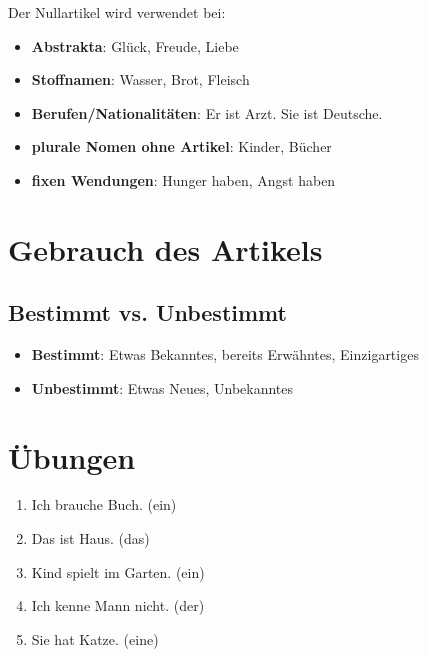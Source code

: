 Der Nullartikel wird verwendet bei:
\begin{itemize}
    \item \textbf{Abstrakta}: Glück, Freude, Liebe
    \item \textbf{Stoffnamen}: Wasser, Brot, Fleisch
    \item \textbf{Berufen/Nationalitäten}: Er ist Arzt. Sie ist Deutsche.
    \item \textbf{plurale Nomen ohne Artikel}: Kinder, Bücher
    \item \textbf{fixen Wendungen}: Hunger haben, Angst haben
\end{itemize}

\section{Gebrauch des Artikels}
\label{sec:ArtikelGebrauch}

\subsection{Bestimmt vs. Unbestimmt}
\begin{itemize}
    \item \textbf{Bestimmt}: Etwas Bekanntes, bereits Erwähntes, Einzigartiges
    \item \textbf{Unbestimmt}: Etwas Neues, Unbekanntes
\end{itemize}

\section{Übungen}
\label{sec:ArtikelUebungen}

\begin{enumerate}
    \item Ich brauche \underline{\hspace{1cm}} Buch. (ein)
    \item Das ist \underline{\hspace{1cm}} Haus. (das)
    \item \underline{\hspace{1cm}} Kind spielt im Garten. (ein)
    \item Ich kenne \underline{\hspace{1cm}} Mann nicht. (der)
    \item Sie hat \underline{\hspace{1cm}}Katze. (eine)
\end{enumerate}

\chapterend